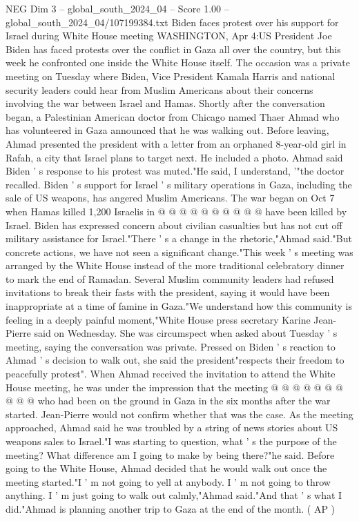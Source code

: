\begin{textsample}{NEG Dim 3 – global\_south\_2024\_04 – Score 1.00 – global\_south\_2024\_04/107199384.txt}  \label{ex:f3_neg_270}
Biden faces protest over his support for Israel during White House meeting WASHINGTON, Apr 4:US President Joe Biden has faced protests over the conflict in Gaza all over the country, but this week he confronted one inside the White House itself.
The occasion was a private meeting on Tuesday where Biden, Vice President Kamala Harris and national security leaders could hear from Muslim Americans about their concerns involving the war between Israel and Hamas.
Shortly after the conversation began, a Palestinian American doctor from Chicago named Thaer Ahmad who has volunteered in Gaza announced that he was walking out.
Before leaving, Ahmad presented the president with a letter from an orphaned 8-year-old girl in Rafah, a city that Israel plans to target next.
He included a photo.
Ahmad said Biden ' s response to his protest was muted."He said, I understand, '"the doctor recalled.
Biden ' s support for Israel ' s military operations in Gaza, including the sale of US weapons, has angered Muslim Americans.
The war began on Oct 7 when Hamas killed 1,200 Israelis in @ @ @ @ @ @ @ @ @ @ have been killed by Israel.
Biden has expressed concern about civilian casualties but has not cut off military assistance for Israel."There ' s a change in the rhetoric,"Ahmad said."But concrete actions, we have not seen a significant change."This week ' s meeting was arranged by the White House instead of the more traditional celebratory dinner to mark the end of Ramadan.
Several Muslim community leaders had refused invitations to break their fasts with the president, saying it would have been inappropriate at a time of famine in Gaza."We understand how this community is feeling in a deeply painful moment,"White House press secretary Karine Jean-Pierre said on Wednesday.
She was circumspect when asked about Tuesday ' s meeting, saying the conversation was private.
Pressed on Biden ' s reaction to Ahmad ' s decision to walk out, she said the president"respects their freedom to peacefully protest".
When Ahmad received the invitation to attend the White House meeting, he was under the impression that the meeting @ @ @ @ @ @ @ @ @ @ who had been on the ground in Gaza in the six months after the war started.
Jean-Pierre would not confirm whether that was the case.
As the meeting approached, Ahmad said he was troubled by a string of news stories about US weapons sales to Israel."I was starting to question, what ' s the purpose of the meeting?
What difference am I going to make by being there?"he said.
Before going to the White House, Ahmad decided that he would walk out once the meeting started."I ' m not going to yell at anybody.
I ' m not going to throw anything.
I ' m just going to walk out calmly,"Ahmad said."And that ' s what I did."Ahmad is planning another trip to Gaza at the end of the month. ( AP )

\end{textsample}
